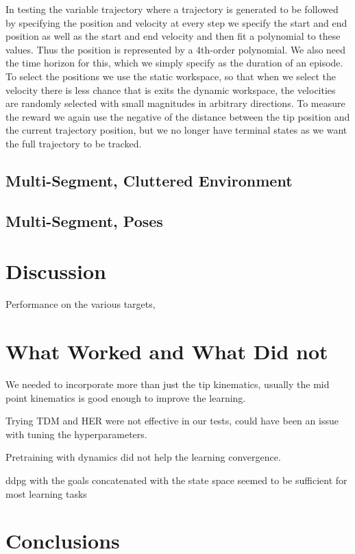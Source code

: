 \documentclass[letterpaper, 10 pt, conference]{ieeeconf}  %
\begin{document}
In testing the variable trajectory where a trajectory is generated to be followed by specifying the position and velocity at every step we specify the start and end position as well as the start and end velocity and then fit a polynomial to these values. Thus the position is represented by a 4th-order polynomial. We also need the time horizon for this, which we simply specify as the duration of an episode. To select the positions we use the static workspace, so that when we select the velocity there is less chance that is exits the dynamic workspace, the velocities are randomly selected with small magnitudes in arbitrary directions. To measure the reward we again use the negative of the distance between the tip position and the current trajectory position, but we no longer have terminal states as we want the full trajectory to be tracked.

\subsection{Multi-Segment, Cluttered Environment}

\subsection{Multi-Segment, Poses}

\section{Discussion}

Performance on the various targets, 

\section{What Worked and What Did not}

We needed to incorporate more than just the tip kinematics, usually the mid point kinematics is good enough to improve the learning. 

Trying TDM and HER were not effective in our tests, could have been an issue with tuning the hyperparameters. 

Pretraining with dynamics did not help the learning convergence.

ddpg with the goals concatenated with the state space seemed to be sufficient for most learning tasks

\section{Conclusions}
\end{document}
